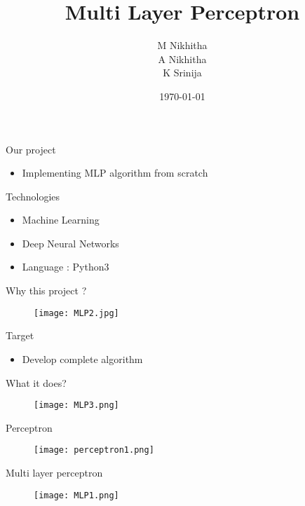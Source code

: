 \documentclass{beamer}
\title{Multi Layer Perceptron }
\author{ M Nikhitha \\ A Nikhitha \\ K Srinija}
\institute[WE]{ TalentSprint - WE program }
\date{\today}
\begin{document}
\begin{frame}
  \titlepage
\end{frame}

\begin{frame}{Our project}
\begin{itemize}
  \item Implementing MLP algorithm from scratch 
\end{itemize}
\end{frame}

\begin{frame}{Technologies}
\begin{itemize}
  \item Machine Learning
  \item Deep Neural Networks
  \item Language : Python3
\end{itemize}
\end{frame}

\begin{frame}{Why this project ?}
\begin{figure}
    \texttt{[image: MLP2.jpg]}
\end{figure}
\end{frame}

\begin{frame}{Target}
\begin{itemize}
  \item Develop complete algorithm 
\end{itemize}
\end{frame}

\begin{frame}{What it does?}
\begin{figure}
    \texttt{[image: MLP3.png]}
\end{figure}
\end{frame}

\begin{frame}{Perceptron}
        \begin{figure}
            \centering
            \texttt{[image: perceptron1.png]}
        \end{figure}
\end{frame}
    
\begin{frame}{Multi layer perceptron}
    \begin{figure}
        \centering
        \texttt{[image: MLP1.png]}
    \end{figure}
\end{frame}
    
\end{document}

